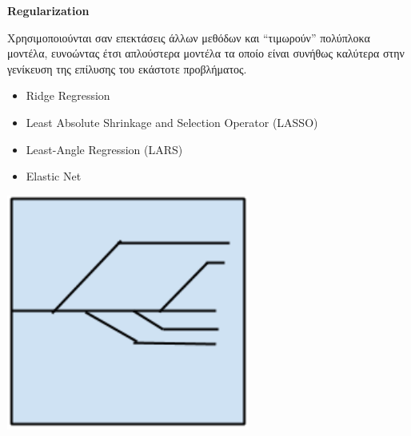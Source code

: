 \begin{minipage}{0.5\textwidth}  %

  \textbf{\large Regularization}

  Χρησιμοποιούνται σαν επεκτάσεις άλλων μεθόδων και
  “τιμωρούν” πολύπλοκα μοντέλα, ευνοώντας έτσι
  απλούστερα μοντέλα τα οποίο είναι συνήθως καλύτερα στην γενίκευση της
  επίλυσης του εκάστοτε προβλήματος.
  \begin{itemize}
    \setlength\itemsep{0em}
    \item{Ridge Regression}
    \item{Least Absolute Shrinkage and Selection Operator (LASSO)}
    \item{Least-Angle Regression (LARS)}
    \item{Elastic Net}
  \end{itemize}
\end{minipage}
\begin{minipage}{0.5\textwidth}
  \begin{center}
    \includegraphics[width=0.6\textwidth]{./images/chapter3/regularization_algorithms.png}
  \end{center}
\end{minipage}

